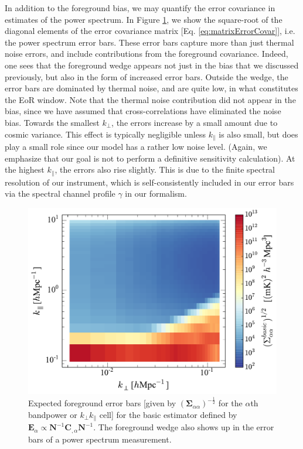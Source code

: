 \documentclass[twocolumn,aps,prd,nofootinbib,showpacs]{revtex4-1}
\begin{document}
In addition to the foreground bias, we may quantify the error covariance in estimates of the power spectrum.  In Figure \ref{fig:basicEstErrorBars}, we show the square-root of the diagonal elements of the error covariance matrix [Eq. \eqref{eq:matrixErrorCovar}], i.e. the power spectrum error bars.  These error bars capture more than just thermal noise errors, and include contributions from the foreground covariance.  Indeed, one sees that the foreground wedge appears not just in the bias that we discussed previously, but also in the form of increased error bars.  Outside the wedge, the error bars are dominated by thermal noise, and are quite low, in what constitutes the EoR window.  Note that the thermal noise contribution did not appear in the bias, since we have assumed that cross-correlations have eliminated the noise bias.  Towards the smallest $k_\perp$, the errors increase by a small amount due to cosmic variance.  This effect is typically negligible unless $k_\parallel$ is also small, but does play a small role since our model has a rather low noise level.  (Again, we emphasize that our goal is not to perform a definitive sensitivity calculation).  At the highest $k_\parallel$, the errors also rise slightly.  This is due to the finite spectral resolution of our instrument, which is self-consistently included in our error bars via the spectral channel profile $\gamma$ in our formalism.

\begin{figure}[t] 
	\centering 
	\includegraphics[width=.49\textwidth]{simpleEstErrorBars.pdf}
	\caption{Expected foreground error bars [given by $\left(\boldsymbol \Sigma_{\alpha\alpha}\right)^{-\frac{1}{2}}$ for the $\alpha$th bandpower or $k_\perp k_\parallel$ cell] for the basic estimator defined by $\mathbf{E}_\alpha \propto \mathbf{N}^{-1} \mathbf{C}_{,\alpha} \mathbf{N}^{-1}$.  The foreground wedge also shows up in the error bars of a power spectrum measurement.}
	\label{fig:basicEstErrorBars}
\end{figure}
\end{document}
